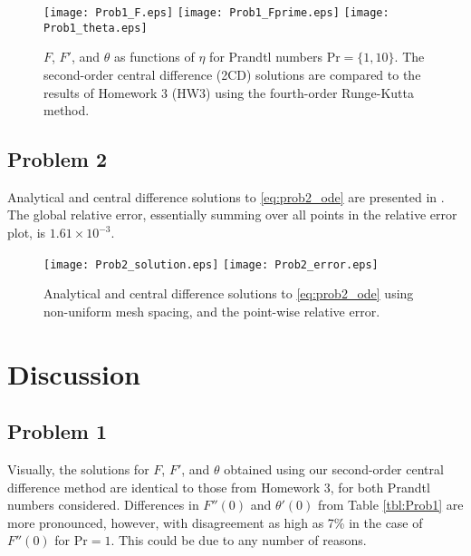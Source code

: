 \documentclass[11pt]{article}
\begin{document}
\begin{figure}[h!]
\begin{center}
\texttt{[image: Prob1\_F.eps]}
\texttt{[image: Prob1\_Fprime.eps]}
\texttt{[image: Prob1\_theta.eps]}
\caption{$F$, $F'$, and $\theta$ as functions of $\eta$ for Prandtl numbers $\text{Pr} = \{1, 10\}$. The second-order central difference (2CD) solutions are compared to the results of Homework 3 (HW3) using the fourth-order Runge-Kutta method.}
\label{fig:Prob1}
\end{center}
\end{figure}

\subsection{Problem 2}

Analytical and central difference solutions to \eqref{eq:prob2_ode} are presented in . The global relative error, essentially summing over all points in the relative error plot, is $1.61 \times 10^{-3}$.

\begin{figure}[h!]
\begin{center}
\texttt{[image: Prob2\_solution.eps]}
\texttt{[image: Prob2\_error.eps]}
\\[-0.5cm]
\caption{Analytical and central difference solutions to \eqref{eq:prob2_ode} using non-uniform mesh spacing, and the point-wise relative error.}
\label{fig:Prob2}
\end{center}
\end{figure}

\section{Discussion} %

\subsection{Problem 1}

Visually, the solutions for $F$, $F'$, and $\theta$ obtained using our second-order central difference method are identical to those from Homework 3, for both Prandtl numbers considered. Differences in $F''(0)$ and $\theta'(0)$ from Table \ref{tbl:Prob1} are more pronounced, however, with disagreement as high as 7\% in the case of $F''(0)$ for $\text{Pr} = 1$. This could be due to any number of reasons.
\end{document}
